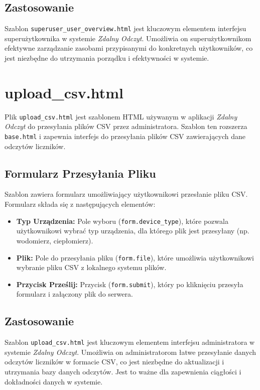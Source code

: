 \documentclass[12pt,a4paper]{report}
\begin{document}
\subsection{Zastosowanie}
Szablon \texttt{superuser\_user\_overview.html} jest kluczowym elementem interfejsu superużytkownika w systemie \textit{Zdalny Odczyt}. Umożliwia on superużytkownikom efektywne zarządzanie zasobami przypisanymi do konkretnych użytkowników, co jest niezbędne do utrzymania porządku i efektywności w systemie.

\section{upload\_csv.html}
\label{sec:uploadcsv}
Plik \texttt{upload\_csv.html} jest szablonem HTML używanym w aplikacji \textit{Zdalny Odczyt} do przesyłania plików CSV przez administratora. Szablon ten rozszerza \texttt{base.html} i zapewnia interfejs do przesyłania plików CSV zawierających dane odczytów liczników.

\subsection{Formularz Przesyłania Pliku}
Szablon zawiera formularz umożliwiający użytkownikowi przesłanie pliku CSV. Formularz składa się z następujących elementów:
\begin{itemize}
\item \textbf{Typ Urządzenia:} Pole wyboru (\texttt{form.device\_type}), które pozwala użytkownikowi wybrać typ urządzenia, dla którego plik jest przesyłany (np. wodomierz, ciepłomierz).
\item \textbf{Plik:} Pole do przesyłania pliku (\texttt{form.file}), które umożliwia użytkownikowi wybranie pliku CSV z lokalnego systemu plików.
\item \textbf{Przycisk Prześlij:} Przycisk (\texttt{form.submit}), który po kliknięciu przesyła formularz i załączony plik do serwera.
\end{itemize}

\subsection{Zastosowanie}
Szablon \texttt{upload\_csv.html} jest kluczowym elementem interfejsu administratora w systemie \textit{Zdalny Odczyt}. Umożliwia on administratorom łatwe przesyłanie danych odczytów liczników w formacie CSV, co jest niezbędne do aktualizacji i utrzymania bazy danych odczytów. Jest to ważne dla zapewnienia ciągłości i dokładności danych w systemie.
\end{document}
